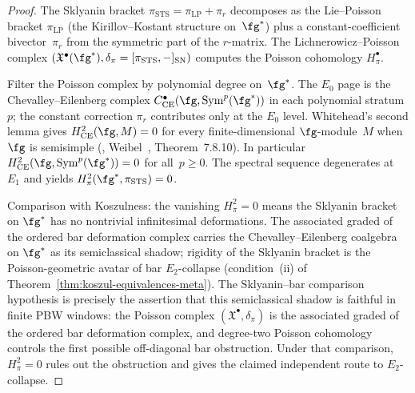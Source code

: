 \begin{proof}
The Sklyanin bracket
$\pi_{\mathrm{STS}} = \pi_{\mathrm{LP}} + \pi_r$ decomposes as the
Lie--Poisson bracket $\pi_{\mathrm{LP}}$ (the Kirillov--Kostant
structure on~$\fg^*$) plus a constant-coefficient bivector~$\pi_r$
from the symmetric part of the $r$-matrix. The Lichnerowicz--Poisson
complex $(\mathfrak{X}^\bullet(\fg^*), \delta_\pi =
[\pi_{\mathrm{STS}}, -]_{\mathrm{SN}})$ computes the Poisson
cohomology $H^\bullet_\pi$.

Filter the Poisson complex by polynomial degree on~$\fg^*$. The
$E_0$ page is the Chevalley--Eilenberg complex
$C^\bullet_{\mathrm{CE}}(\fg, \mathrm{Sym}^p(\fg^*))$ in each
polynomial stratum~$p$; the constant correction $\pi_r$ contributes
only at the $E_0$ level. Whitehead's second lemma gives
$H^2_{\mathrm{CE}}(\fg, M) = 0$ for every finite-dimensional
$\fg$-module~$M$ when $\fg$ is semisimple
(\ClaimStatusProvedElsewhere, Weibel~\cite{Weibel94}, Theorem~7.8.10).
In particular $H^2_{\mathrm{CE}}(\fg, \mathrm{Sym}^p(\fg^*)) = 0$
for all~$p \geq 0$. The spectral sequence degenerates at~$E_1$
and yields $H^2_\pi(\fg^*, \pi_{\mathrm{STS}}) = 0$.

Comparison with Koszulness:
the vanishing $H^2_\pi = 0$ means the Sklyanin bracket on
$\fg^*$ has no nontrivial infinitesimal deformations.
The associated graded of the ordered bar deformation complex carries
the Chevalley--Eilenberg coalgebra on $\fg^*$ as its semiclassical
shadow; rigidity of the
Sklyanin bracket is the Poisson-geometric avatar of bar $E_2$-collapse
(condition~(ii) of
Theorem~\ref{thm:koszul-equivalences-meta}). The Sklyanin--bar
comparison hypothesis is precisely the assertion that this
semiclassical shadow is faithful in finite PBW windows: the Poisson
complex $(\mathfrak{X}^\bullet, \delta_\pi)$ is the associated graded of
the ordered bar deformation complex, and degree-two Poisson cohomology
controls the first possible off-diagonal bar obstruction. Under that
comparison, $H^2_\pi=0$ rules out the obstruction and gives the claimed
independent route to $E_2$-collapse.
\end{proof}

